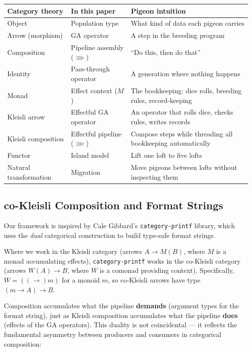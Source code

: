 \documentclass[10pt]{article}
\begin{document}
\begin{table}[ht]
\centering
\small
\begin{tabular}{@{}lll@{}}
\toprule
\textbf{Category theory} & \textbf{In this paper} & \textbf{Pigeon intuition} \\
\midrule
Object               & Population type                    & What kind of data each pigeon carries \\
Arrow (morphism)     & GA operator                        & A step in the breeding program \\
Composition          & Pipeline assembly ($\ggg$)         & ``Do this, then do that'' \\
Identity             & Pass-through operator              & A generation where nothing happens \\
Monad                & Effect context ($M$)               & The bookkeeping: dice rolls, breeding rules, record-keeping \\
Kleisli arrow        & Effectful GA operator              & An operator that rolls dice, checks rules, writes records \\
Kleisli composition  & Effectful pipeline ($\ggg$)        & Compose steps while threading all bookkeeping automatically \\
Functor              & Island model                       & Lift one loft to five lofts \\
Natural transformation & Migration                        & Move pigeons between lofts without inspecting them \\
\bottomrule
\end{tabular}
\end{table}


\subsection{co-Kleisli Composition and Format Strings}

Our framework is inspired by Cale Gibbard's \texttt{category-printf} library, which uses the \emph{dual} categorical construction to build type-safe format strings.

Where we work in the Kleisli category (arrows $A \to M(B)$, where $M$ is a monad accumulating effects), \texttt{category-printf} works in the co-Kleisli category (arrows $W(A) \to B$, where $W$ is a comonad providing context). Specifically, $W = ((\to) m)$ for a monoid $m$, so co-Kleisli arrows have type $(m \to A) \to B$.

Composition accumulates what the pipeline \textbf{demands} (argument types for the format string), just as Kleisli composition accumulates what the pipeline \textbf{does} (effects of the GA operators). This duality is not coincidental --- it reflects the fundamental asymmetry between producers and consumers in categorical composition:
\end{document}
